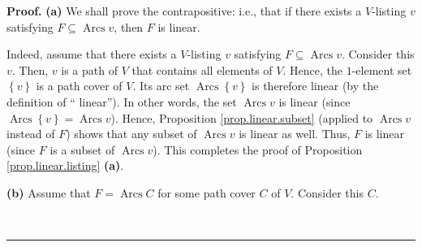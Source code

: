 \documentclass[numbers=enddot,12pt,final,onecolumn,notitlepage]{scrartcl}%
\numberwithin{exer}{section}
\theoremstyle{definition}
\newenvironment{proof}[1][Proof]{\noindent\textbf{#1.} }{\ \rule{0.5em}{0.5em}}
\newenvironment{verlong}{}{}
\begin{document}
\begin{verlong}


\begin{proof}
\textbf{(a)} We shall prove the contrapositive: i.e., that if there exists a
$V$-listing $v$ satisfying $F\subseteq\operatorname*{Arcs}v$, then $F$ is linear.

Indeed, assume that there exists a $V$-listing $v$ satisfying $F\subseteq
\operatorname*{Arcs}v$. Consider this $v$. Then, $v$ is a path of $V$ that
contains all elements of $V$. Hence, the $1$-element set $\left\{  v\right\}
$ is a path cover of $V$. Its arc set $\operatorname*{Arcs}\left\{  v\right\}
$ is therefore linear (by the definition of \textquotedblleft
linear\textquotedblright). In other words, the set $\operatorname*{Arcs}v$ is
linear (since $\operatorname*{Arcs}\left\{  v\right\}  =\operatorname*{Arcs}%
v$). Hence, Proposition \ref{prop.linear.subset} (applied to
$\operatorname*{Arcs}v$ instead of $F$) shows that any subset of
$\operatorname*{Arcs}v$ is linear as well. Thus, $F$ is linear (since $F$ is a
subset of $\operatorname*{Arcs}v$). This completes the proof of Proposition
\ref{prop.linear.listing} \textbf{(a)}. \medskip

\textbf{(b)} Assume that $F=\operatorname*{Arcs}C$ for some path cover $C$ of
$V$. Consider this $C$.


\end{proof}
\end{verlong}
\end{document}
